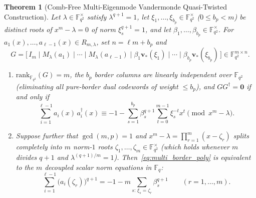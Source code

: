 \documentclass[11pt,a4paper]{article}
\newcommand{\vb}[1]{\symbf{#1}}
\newcommand{\vb}[1]{\mathbf{#1}}
\newtheorem{theorem}{Theorem}
\theoremstyle{remark}
\begin{document}
\begin{theorem}[Comb-Free Multi-Eigenmode Vandermonde Quasi-Twisted Construction]\label{thm:vandermonde_qt}
Let $\lambda \in \mathbb{F}_{q^2}^\times$ satisfy $\lambda^{q+1} = 1$, let $\xi_1, \dots, \xi_{b_p} \in \mathbb{F}_{q^2}^\times$ ($0 \le b_p < m$) be distinct roots of $x^m - \lambda = 0$ of norm $\xi_s^{q+1} = 1$, and let $\beta_1, \dots, \beta_{b_p} \in \mathbb{F}_{q^2}^\times$. For $a_1(x), \dots, a_{\ell-1}(x) \in R_{m,\lambda}$, set $n = \ell m + b_p$ and
\[
  G = \bigl[\, I_m \;\big|\; M_\lambda(a_1) \;\big|\; \cdots \;\big|\; M_\lambda(a_{\ell-1}) \;\big|\; \beta_1 \vb{v}_*(\xi_1) \;\big|\; \cdots \;\big|\; \beta_{b_p} \vb{v}_*(\xi_{b_p}) \,\bigr] \in \mathbb{F}_{q^2}^{m \times n}.
\]
\begin{enumerate}
  \item $\mathrm{rank}_{\mathbb{F}_{q^2}}(G) = m$, the $b_p$ border columns are linearly independent over $\mathbb{F}_{q^2}$ (eliminating all pure-border dual codewords of weight $\le b_p$), and $G G^\dagger = \vb{0}$ if and only if
  \begin{equation}\label{eq:multi_border_poly}
    \sum_{i=1}^{\ell-1} a_i(x)\, a_i^\dagger(x) \equiv -1 - \sum_{s=1}^{b_p} \beta_s^{q+1} \sum_{t=0}^{m-1} \xi_s^{-t} x^t \pmod{x^m - \lambda}.
  \end{equation}
  \item Suppose further that $\gcd(m, p) = 1$ and $x^m - \lambda = \prod_{r=1}^m (x - \zeta_r)$ splits completely into $m$ norm-$1$ roots $\zeta_1, \dots, \zeta_m \in \mathbb{F}_{q^2}^\times$ (which holds whenever $m$ divides $q + 1$ and $\lambda^{(q+1)/m} = 1$). Then~\eqref{eq:multi_border_poly} is equivalent to the $m$ decoupled scalar norm equations in $\mathbb{F}_q$:
  \begin{equation}\label{eq:spectral_fourier}
    \sum_{i=1}^{\ell-1} \bigl(a_i(\zeta_r)\bigr)^{q+1} = -1 - m \sum_{s:\, \xi_s = \zeta_r} \beta_s^{q+1} \qquad (r = 1, \dots, m).
  \end{equation}
\end{enumerate}
\end{theorem}
\end{document}
